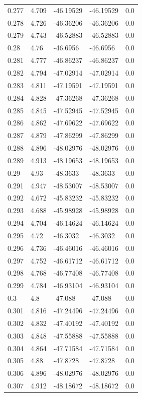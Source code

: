 \begin{tabular}{lllll}
0.277 & 4.709 & -46.19529 & -46.19529 & 0.0 \\
0.278 & 4.726 & -46.36206 & -46.36206 & 0.0 \\
0.279 & 4.743 & -46.52883 & -46.52883 & 0.0 \\
0.28 & 4.76 & -46.6956 & -46.6956 & 0.0 \\
0.281 & 4.777 & -46.86237 & -46.86237 & 0.0 \\
0.282 & 4.794 & -47.02914 & -47.02914 & 0.0 \\
0.283 & 4.811 & -47.19591 & -47.19591 & 0.0 \\
0.284 & 4.828 & -47.36268 & -47.36268 & 0.0 \\
0.285 & 4.845 & -47.52945 & -47.52945 & 0.0 \\
0.286 & 4.862 & -47.69622 & -47.69622 & 0.0 \\
0.287 & 4.879 & -47.86299 & -47.86299 & 0.0 \\
0.288 & 4.896 & -48.02976 & -48.02976 & 0.0 \\
0.289 & 4.913 & -48.19653 & -48.19653 & 0.0 \\
0.29 & 4.93 & -48.3633 & -48.3633 & 0.0 \\
0.291 & 4.947 & -48.53007 & -48.53007 & 0.0 \\
0.292 & 4.672 & -45.83232 & -45.83232 & 0.0 \\
0.293 & 4.688 & -45.98928 & -45.98928 & 0.0 \\
0.294 & 4.704 & -46.14624 & -46.14624 & 0.0 \\
0.295 & 4.72 & -46.3032 & -46.3032 & 0.0 \\
0.296 & 4.736 & -46.46016 & -46.46016 & 0.0 \\
0.297 & 4.752 & -46.61712 & -46.61712 & 0.0 \\
0.298 & 4.768 & -46.77408 & -46.77408 & 0.0 \\
0.299 & 4.784 & -46.93104 & -46.93104 & 0.0 \\
0.3 & 4.8 & -47.088 & -47.088 & 0.0 \\
0.301 & 4.816 & -47.24496 & -47.24496 & 0.0 \\
0.302 & 4.832 & -47.40192 & -47.40192 & 0.0 \\
0.303 & 4.848 & -47.55888 & -47.55888 & 0.0 \\
0.304 & 4.864 & -47.71584 & -47.71584 & 0.0 \\
0.305 & 4.88 & -47.8728 & -47.8728 & 0.0 \\
0.306 & 4.896 & -48.02976 & -48.02976 & 0.0 \\
0.307 & 4.912 & -48.18672 & -48.18672 & 0.0 \\

\end{tabular}
